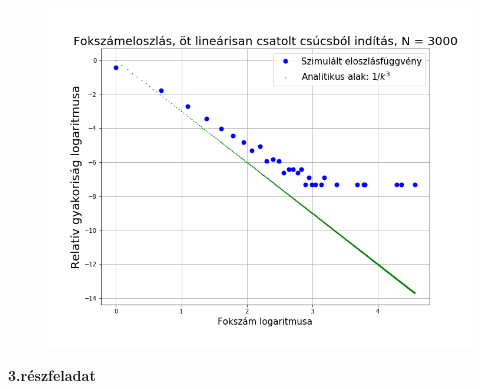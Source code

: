 \documentclass[a4paper, 12pt]{article}
\numberwithin{equation}{section}          %
\numberwithin{figure}{subsection}
\begin{document}
\begin{figure}[c!]
	\begin{center}
		\includegraphics[width=1\textwidth]{masodik3000log.png}
	\end{center}
\end{figure}

\clearpage


\textbf{3.részfeladat}\newline
\end{document}
